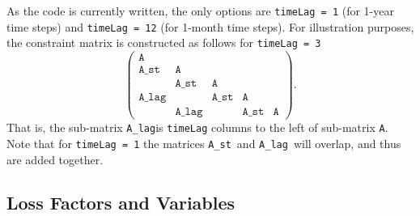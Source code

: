 \documentclass[11pt]{article}
\newcommand{\A}{\texttt{A}}
\newcommand{\Ast}{\texttt{A\_st}}
\newcommand{\Alag}{\texttt{A\_lag}}
\begin{document}
As the code is currently written, the only options are \texttt{timeLag = 1} (for 1-year time steps) and \texttt{timeLag = 12} (for 1-month time steps).
For illustration purposes, the constraint matrix is constructed as follows for \texttt{timeLag = 3}
\[
	\left(
	\begin{array}{ccccc}
		\A    &       &      &      &    \\
		\Ast  & \A    &      &      &    \\
		      & \Ast  & \A   &      &    \\
		\Alag &       & \Ast & \A   &    \\
		      & \Alag &      & \Ast & \A
	\end{array}
	\right).
\]
That is, the sub-matrix \Alag is \texttt{timeLag} columns to the left of sub-matrix \A.
Note that for \texttt{timeLag = 1} the matrices \Ast\ and \Alag\ will overlap, and thus are added together.

\subsection{Loss Factors and Variables}
\label{ssec:loss}
\end{document}
